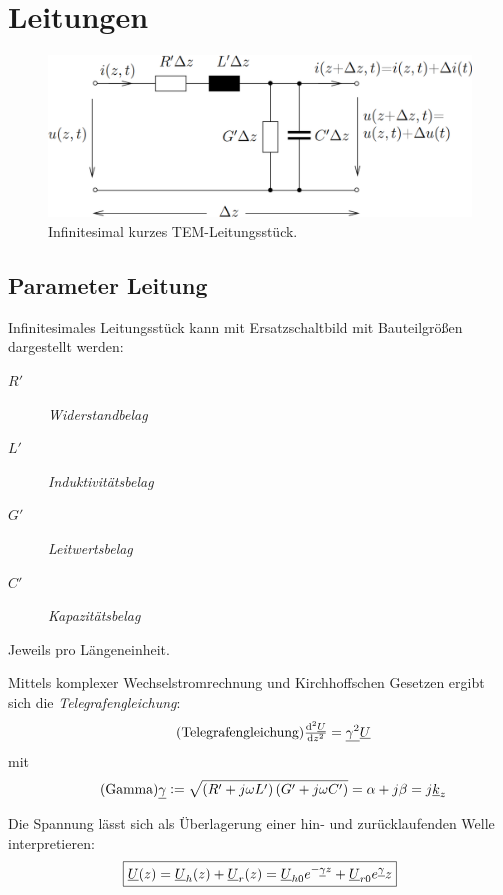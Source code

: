 \chapter{Leitungen}
\begin{figure}[H]
    \centering
    \includegraphics[width=\textwidth]{images/leitung.png}
    \caption{Infinitesimal kurzes TEM-Leitungsstück.}
\end{figure}

\section{Parameter Leitung}
Infinitesimales Leitungsstück kann mit Ersatzschaltbild mit Bauteilgrößen dargestellt werden:
\begin{description}
    \item[$R'$] \emph{Widerstandbelag}
    \item[$L'$] \emph{Induktivitätsbelag}
    \item[$G'$] \emph{Leitwertsbelag}
    \item[$C'$] \emph{Kapazitätsbelag}
\end{description}
Jeweils pro Längeneinheit.

Mittels komplexer Wechselstromrechnung und Kirchhoffschen Gesetzen ergibt sich die \emph{Telegrafengleichung}:
\begin{equation}
    \tag{Telegrafengleichung}
    \od[2]{\UU}{z} = \underline{\gamma^2}\UU
    \label{eqn:Telegraf}
\end{equation}
mit
\begin{equation}
    \tag{Gamma}
    \underline{\gamma} := \sqrt{\left(R'+j\omega L'\right)\left(G'+j\omega C'\right)} = \alpha + j\beta = j\underline{k}_z
    \label{eqn:gamma}
\end{equation}

Die Spannung lässt sich als Überlagerung einer hin- und zurücklaufenden Welle interpretieren:
\begin{equation}
    \boxed{ \underline{U}(z)=\underline{U}_h(z)+\underline{U}_r(z) = \underline{U}_{h0} e^{-\underline{\gamma} z}+\underline{U}_{r0} e^{\underline{\gamma}}z }
\label{eqn:u-uberlagerung}
\end{equation}


